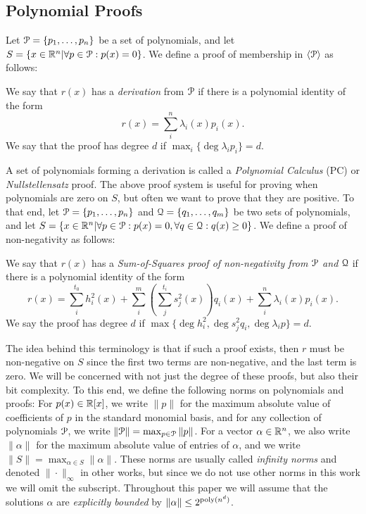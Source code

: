 \documentclass[a4paper,UKenglish]{lipics-v2016}
\begin{document}
\subsection{Polynomial Proofs}
Let $\mathcal P = \{p_1,\dots,p_n\}$ be a set of polynomials, and let $S = \{x \in \mathbb R^n | \forall p \in \mathcal P: p(x) = 0\}$. We define a proof of membership in $\langle \mathcal P\rangle$ as follows:
\begin{definition}
We say that $r(x)$ has a \emph{derivation} from $\mathcal P$ if there is a polynomial identity of the form
\[r(x) = \sum_{i}^n \lambda_i(x) p_i(x).\]
We say that the proof has degree $d$ if $\max_i \{\deg \lambda_i p_i\} = d$.
\end{definition}

A set of polynomials forming a derivation is called a \emph{Polynomial Calculus} (PC) or \emph{Nullstellensatz} proof. The above proof system is useful for proving when polynomials are zero on $S$, but often we want to prove that they are positive. To that end, let $\mathcal P = \{p_1,\dots,p_n\}$ and $\mathcal Q = \{q_1,\dots,q_m\}$ be two sets of polynomials, and let $S = \{x \in \mathbb R^n | \forall p \in \mathcal P: p(x) = 0, \forall q \in \mathcal Q: q(x) \geq 0\}$. We define a proof of non-negativity as follows:
\begin{definition}
 We say that $r(x)$ has a \emph{Sum-of-Squares proof of non-negativity from $\mathcal P$ and $\mathcal Q$} if there is a polynomial identity of the form
\[r(x) = \sum_{i}^{t_0} h_i^2(x) + \sum_{i}^m \left(\sum_{j}^{t_i} s_j^2(x)\right)q_i(x) + \sum_{i}^n \lambda_i(x) p_i(x).\]
We say the proof has degree $d$ if $\max \{\deg h_i^2, \deg s_j^2q_i, \deg \lambda_i p\} = d$.
\end{definition}
The idea behind this terminology is that if such a proof exists, then $r$ must be non-negative on $S$ since the first two terms are non-negative, and the last term is zero. We will be concerned with not just the degree of these proofs, but also their bit complexity. To this end, we define the following norms on polynomials and proofs: For $p(x) \in \mathbb R[x]$, we write $\|p\|$ for the maximum absolute value of coefficients of $p$ in the standard monomial basis, and for any collection of polynomials $\mathcal P$, we write $\|\mathcal P\| = \max_{p \in \mathcal P} \|p\|$. For a vector $\alpha \in \mathbb R^n$, we also write $\|\alpha\|$ for the maximum absolute value of entries of $\alpha$, and we write $\|S\| = \max_{\alpha \in S} \|\alpha\|$. These norms are usually called \emph{infinity norms} and denoted $\| \cdot \|_\infty$ in other works, but since we do not use other norms in this work we will omit the subscript. Throughout this paper we will assume that the solutions $\alpha$ are {\it explicitly bounded} by $\|\alpha\| \leq 2^{\operatorname{poly}(n^d)}$.
\end{document}
